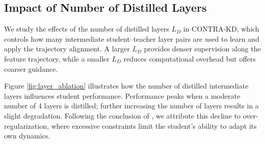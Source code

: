 \documentclass{article} %
\theoremstyle{definition}
\theoremstyle{remark}
\begin{document}
\subsection{Impact of Number of Distilled Layers}
We study the effects of the number of distilled layers $L_D$ in CONTRA-KD, which controls how many intermediate student–teacher layer pairs are used to learn and apply the trajectory alignment. A larger $L_D$ provides denser supervision along the feature trajectory, while a smaller $L_D$ reduces computational overhead but offers coarser guidance.

\begin{minipage}[t]{0.48\textwidth}
\vspace{0pt} %
Figure \ref{fig:layer_ablation} illustrates how the number of distilled intermediate layers influences student performance. Performance peaks when a moderate number of 4 layers is distilled; further increasing the number of layers results in a slight degradation. Following the conclusion of \cite{gong-etal-2025-beyond}, we attribute this decline to over-regularization, where excessive constraints limit the student's ability to adapt its own dynamics.
\end{minipage}%
\hfill
\begin{minipage}[t]{0.48\textwidth}
\vspace{0pt} %
\centering
\label{fig:layer_ablation}
\end{minipage}
\end{document}
